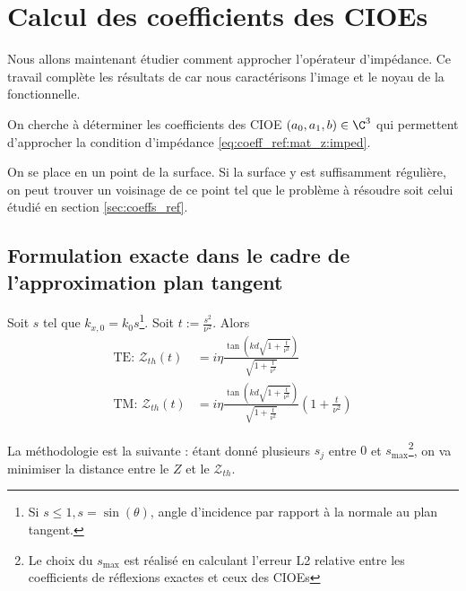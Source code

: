 \section{Calcul des coefficients des CIOEs}\label{sec:coeffs_cioe}

Nous allons maintenant étudier comment approcher l'opérateur d'impédance. Ce travail complète les résultats de \cite[Annexe~A]{stupfel_implementation_2015} car nous caractérisons l'image et le noyau de la fonctionnelle.

On cherche à déterminer les coefficients des CIOE $(a_0,a_1,b) \in \C^3$ qui permettent d'approcher la condition d'impédance \eqref{eq:coeff_ref:mat_z:imped}.


On se place en un point de la surface. Si la surface y est suffisamment régulière, on peut trouver un voisinage de ce point tel que le problème à résoudre soit celui étudié en section \ref{sec:coeffs_ref}.

\subsection{Formulation exacte dans le cadre de l'approximation plan tangent}

Soit $s$ tel que $k_{x,0} = k_0s$\footnote{Si  $s \le 1, s=\sin(\theta)$, angle d'incidence par rapport à la normale au plan tangent.}. Soit $t := \frac{s^2}{\nu^2}$. Alors
\begin{align*}
  \text{TE: } \mathcal Z_{th}(t) &= i\eta \frac{\tan\left(kd\sqrt{1+\frac{t}{\nu^2}}\right)}{\sqrt{1+\frac{t}{\nu^2}}}\\
  \text{TM: } \mathcal Z_{th}(t) &= i\eta \frac{\tan\left(kd\sqrt{1+\frac{t}{\nu^2}}\right)}{\sqrt{1+\frac{t}{\nu^2}}}(1+\frac{t}{\nu^2})
\end{align*}

La méthodologie est la suivante : étant donné plusieurs $s_j$ entre $0$ et $s_{\max}$\footnote{Le choix du $s_{\max}$ est réalisé en calculant l'erreur L2 relative entre les coefficients de réflexions exactes et ceux des CIOEs}, on va minimiser la distance entre le $Z$ et le $\mathcal{Z}_{th}$.

